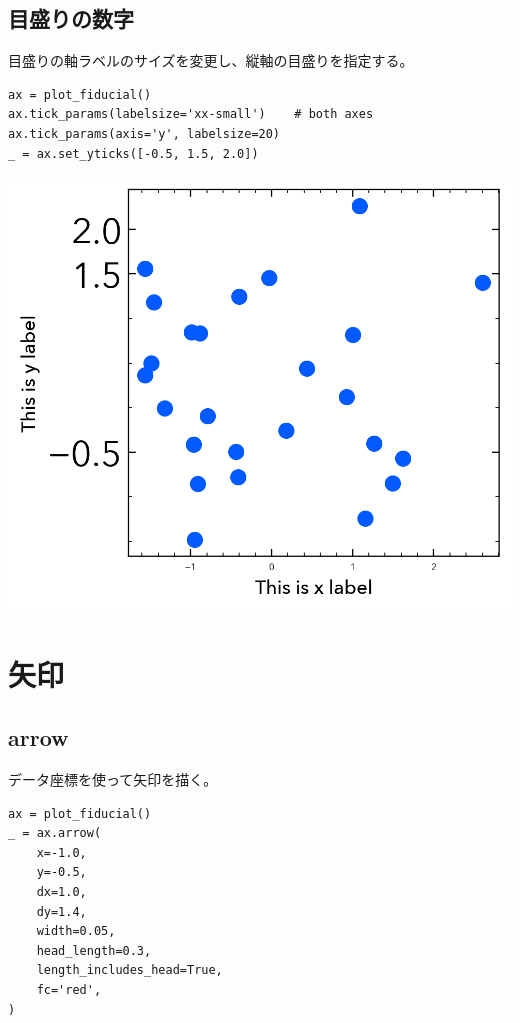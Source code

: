 \documentclass[a4paper, 10pt, notitlepage, twocolumn, uplatex, oneside, dvipdfmx]{jsarticle}
\begin{document}
\subsection{目盛りの数字}
\label{sec:orgfb6ce28}
目盛りの軸ラベルのサイズを変更し、縦軸の目盛りを指定する。
\begin{verbatim}
ax = plot_fiducial()
ax.tick_params(labelsize='xx-small')    # both axes
ax.tick_params(axis='y', labelsize=20)
_ = ax.set_yticks([-0.5, 1.5, 2.0])
\end{verbatim}

\begin{center}
\includegraphics[width=1.0\linewidth]{./obipy-resources/params_ticks.png}
\end{center}
\section{矢印}
\label{sec:org6b68ac0}
\subsection{arrow}
\label{sec:org1009cfc}
データ座標を使って矢印を描く。
\begin{verbatim}
ax = plot_fiducial()
_ = ax.arrow(
    x=-1.0,
    y=-0.5,
    dx=1.0,
    dy=1.4,
    width=0.05,
    head_length=0.3,
    length_includes_head=True,
    fc='red',
)
\end{verbatim}
\end{document}
